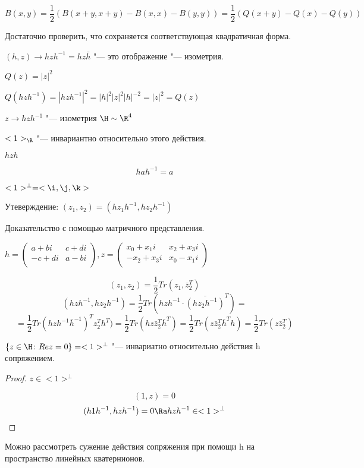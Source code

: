 $$B(x, y) = \frac{1}{2}(B(x + y, x + y) - B(x, x) - B(y, y)) = \frac{1}{2}(Q(x + y) - Q(x) - Q(y))$$

Достаточно проверить, что сохраняется соответствующая квадратичная форма.

$(h, z) \to hzh^{-1}  = hz\bar h$  "--- это отображение "--- изометрия.

$Q(z) = |z|^2$

$Q(hzh^{-1}) = |hzh^{-1}|^2 = |h|^2|z|^2|h|^{-2} = |z|^2 = Q(z)$

$z \to hzh^{-1}$ "--- изометрия $\H \sim \R^4$

$<1>_{\R}$ "--- инвариантно относительно этого действия.

$hzh$

$$hah^{-1} = a$$

$<1>^\bot = <\i, \j, \k>$

Утеверждение: $(z_1, z_2) = (hz_1h^{-1}, hz_2h^{-1})$

\begin{Rem}
Доказательство с помощью матричного представления.

$h = \begin{pmatrix}
a+bi & c + di\\
-c + di & a - bi\\
\end{pmatrix},
z =
\begin{pmatrix}
x_0 + x_1i & x_2 + x_3i\\
-x_2 + x_3i & x_0 - x_1i\\
\end{pmatrix}
$

$$(z_1, z_2) = \frac{1}{2}Tr(z_1, \bar z_2^T)$$
$$(hzh^{-1}, hz_2h^{-1}) = \frac{1}{2}Tr(hzh^{-1}\cdot \overline{(h z_2 h^{-1})}^T) = $$
$$= \frac{1}{2}Tr(hzh^{-1}\bar h^{-1})^Tz_2^Th^T) = \frac{1}{2}Tr(hz\bar z_2^T \bar h^T) = \frac{1}{2}Tr(z\bar z_2^T\bar h^Th) = \frac{1}{2}Tr(z\bar z_2^T)$$

\end{Rem}

\begin{conseq}
 $\{z \in \H\colon Re z = 0\} = <1>^\bot$ "--- инвариатно
 относительно действия h сопряжением.
\end{conseq}

\begin{proof}
$z \in <1>^\bot$

$$(1, z) = 0$$
$$(h1h^{-1}, hzh^{-1}) = 0 \Ra hzh^{-1} \in <1>^\bot$$
\end{proof}

Можно рассмотреть сужение действия сопряжения при помощи h на пространство линейных кватернионов.

